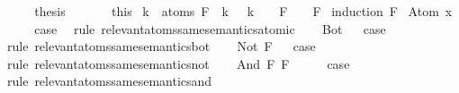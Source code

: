 \begin{isabellebody}
\ \ \isamarkupfalse%
\ \isamarkupfalse%
\ {\isacharquery}thesis\ \isanewline
\ \ \ \ \isamarkupfalse%
\ this\isanewline
{}\isamarkupfalse%
%
\endisatagproof
{\isafoldproof}%
%
\isadelimproof
\isanewline
%
\endisadelimproof
\isanewline
{}\isamarkupfalse%
\ {\isachardoublequoteopen}{\isasymforall}k\ {\isasymin}\ atoms\ F{\isachardot}\ {\isasymA}\ k\ {\isacharequal}\ {\isasymA}\ k\ {\isasymLongrightarrow}\ {\isasymA}\ {\isasymTurnstile}\ F\ {\isasymlongleftrightarrow}\ {\isasymA}\ {\isasymTurnstile}\ F{\isachardoublequoteclose}\isanewline
%
\isadelimproof
%
\endisadelimproof
%
\isatagproof
{}\isamarkupfalse%
\ {\isacharparenleft}induction\ F{\isacharparenright}\isanewline
{}\isamarkupfalse%
\ {\isacharparenleft}Atom\ x{\isacharparenright}\isanewline
\ \ \isamarkupfalse%
\ \isamarkupfalse%
\ {\isacharquery}case\ \isamarkupfalse%
\ {\isacharparenleft}rule\ relevant{\isacharunderscore}atoms{\isacharunderscore}same{\isacharunderscore}semantics{\isacharunderscore}atomic{\isacharparenright}\isanewline
{}\isamarkupfalse%
\isanewline
\ \ \isamarkupfalse%
\ Bot\isanewline
{}\isamarkupfalse%
\ \isamarkupfalse%
\ {\isacharquery}case\ \isamarkupfalse%
\ {\isacharparenleft}rule\ relevant{\isacharunderscore}atoms{\isacharunderscore}same{\isacharunderscore}semantics{\isacharunderscore}bot{\isacharparenright}\isanewline
{}\isamarkupfalse%
\isanewline
\ \ \isamarkupfalse%
\ {\isacharparenleft}Not\ F{\isacharparenright}\isanewline
{}\isamarkupfalse%
\ \isamarkupfalse%
\ {\isacharquery}case\ \isamarkupfalse%
\ {\isacharparenleft}rule\ relevant{\isacharunderscore}atoms{\isacharunderscore}same{\isacharunderscore}semantics{\isacharunderscore}not{\isacharparenright}\isanewline
{}\isamarkupfalse%
\isanewline
\ \ \isamarkupfalse%
\ {\isacharparenleft}And\ F{}\ F{}{\isacharparenright}\isanewline
\ \ \isamarkupfalse%
\ \isamarkupfalse%
\ {\isacharquery}case\ \isamarkupfalse%
\ {\isacharparenleft}rule\ relevant{\isacharunderscore}atoms{\isacharunderscore}same{\isacharunderscore}semantics{\isacharunderscore}and{\isacharparenright}\isanewline
{}\isamarkupfalse%

\end{isabellebody}
